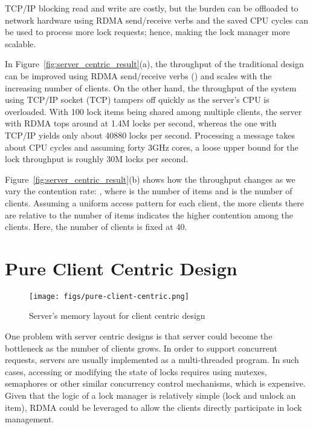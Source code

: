 \documentclass[twoside]{article}
\begin{document}
\begin{multicols}{2}
TCP/IP blocking read and write are costly, but the burden can be offloaded to network hardware using RDMA send/receive verbs and the saved CPU cycles can be used to process more lock requests; hence, making the lock manager more scalable. 


In Figure~\ref{fig:server_centric_result}(a), the throughput of the traditional design can be improved using RDMA send/receive verbs () and scales with the increasing number of clients. On the other hand, the throughput of the system using TCP/IP socket (TCP) tampers off quickly as the server's CPU is overloaded. With 100 lock items being shared among multiple clients, the server with RDMA tops around at 1.4M locks per second, whereas the one with TCP/IP yields only about 40880 locks per second. Processing a message takes about  CPU cycles and assuming forty 3GHz cores, a loose upper bound for the lock throughput is roughly 30M locks per second.

Figure~\ref{fig:server_centric_result}(b) shows how the throughput changes as we vary the contention rate: , where  is the number of items and  is the number of clients. Assuming a uniform access pattern for each client, the more clients there are relative to the number of items indicates the higher contention among the clients. Here, the number of clients is fixed at 40. 




\section{Pure Client Centric Design}
\label{client_DLM}

\begin{figure*}
    \centering
    \texttt{[image: figs/pure-client-centric.png]}
    \caption{Server's memory layout for client centric design}
    \label{fig:pure-design}
\end{figure*}
One problem with server centric designs is that server could become the bottleneck as the number of clients grows.
In order to support concurrent requests, servers are usually implemented as a multi-threaded program.
In such cases, accessing or modifying the state of locks requires using mutexes, semaphores or other similar concurrency control mechanisms, which is expensive.
Given that the logic of a lock manager is relatively simple (lock and unlock an item), RDMA could be leveraged to allow the clients directly participate in lock management.


\end{multicols}
\end{document}
